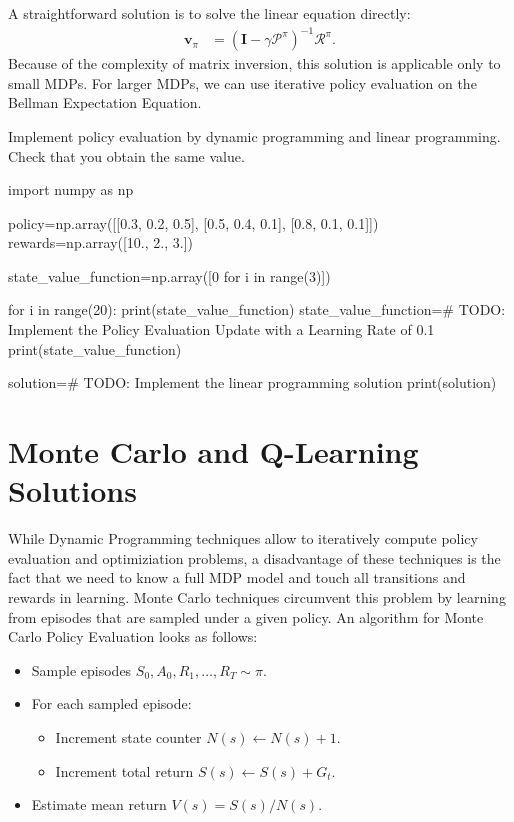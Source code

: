 \noindent A straightforward solution is to solve the linear equation directly:
\begin{align*}
    \boldsymbol{v}_{\pi} & = (\boldsymbol{I} -  \gamma \boldsymbol{\mathcal{P}}^{\pi})^{-1} \boldsymbol{\mathcal{R}}^{\pi}.
\end{align*}
Because of the complexity of matrix inversion, this solution is applicable only to small MDPs. For larger MDPs, we can use iterative policy evaluation on the Bellman Expectation Equation.

\begin{exercise}
\label{exercise:PolicyEvaluation}
Implement policy evaluation by dynamic programming and linear programming. Check that you obtain the same value.

\begin{python}
import numpy as np

policy=np.array([[0.3, 0.2, 0.5], [0.5, 0.4, 0.1], [0.8, 0.1, 0.1]])
rewards=np.array([10., 2., 3.])

state_value_function=np.array([0 for i in range(3)])

for i in range(20):
    print(state_value_function)
    state_value_function=# TODO: Implement the Policy Evaluation Update with a Learning Rate of 0.1
print(state_value_function)

solution=# TODO: Implement the linear programming solution
print(solution)
\end{python}
\end{exercise}

\section{Monte Carlo and Q-Learning Solutions}

While Dynamic Programming techniques allow to iteratively compute policy evaluation and optimiziation problems, a disadvantage of these techniques is the fact that we need to know a full MDP model and touch all transitions and rewards in learning. Monte Carlo techniques circumvent this problem by learning from episodes that are sampled under a given policy. An algorithm for Monte Carlo Policy Evaluation looks as follows: 
\begin{itemize}
  \item Sample episodes $S_0, A_0, R_1, \ldots, R_T \sim \pi$.
    \item For each sampled episode:
  \begin{itemize}
  \item Increment state counter $N(s) \leftarrow N(s) + 1$.
  \item Increment total return $S(s) \leftarrow S(s) + G_t$.
    \end{itemize}
  \item Estimate mean return $V(s) = S(s)/N(s)$.
  \end{itemize}

